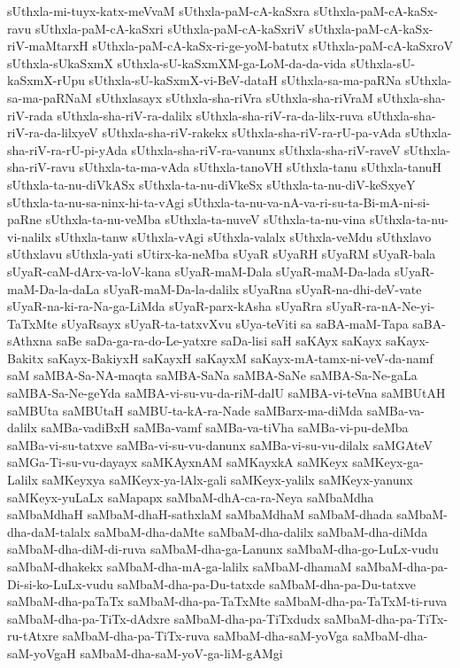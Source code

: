 {sUthxla-mi-tuyx-katx-meVvaM
sUthxla-paM-cA-kaSxra
sUthxla-paM-cA-kaSx-ravu
sUthxla-paM-cA-kaSxri
sUthxla-paM-cA-kaSxriV
sUthxla-paM-cA-kaSx-riV-maMtarxH
sUthxla-paM-cA-kaSx-ri-ge-yoM-batutx
sUthxla-paM-cA-kaSxroV
sUthxla-sUkaSxmX
sUthxla-sU-kaSxmXM-ga-LoM-da-da-vida
sUthxla-sU-kaSxmX-rUpu
sUthxla-sU-kaSxmX-vi-BeV-dataH
sUthxla-sa-ma-paRNa
sUthxla-sa-ma-paRNaM
sUthxlasayx
sUthxla-sha-riVra
sUthxla-sha-riVraM
sUthxla-sha-riV-rada
sUthxla-sha-riV-ra-dalilx
sUthxla-sha-riV-ra-da-lilx-ruva
sUthxla-sha-riV-ra-da-lilxyeV
sUthxla-sha-riV-rakekx
sUthxla-sha-riV-ra-rU-pa-vAda
sUthxla-sha-riV-ra-rU-pi-yAda
sUthxla-sha-riV-ra-vanunx
sUthxla-sha-riV-raveV
sUthxla-sha-riV-ravu
sUthxla-ta-ma-vAda
sUthxla-tanoVH
sUthxla-tanu
sUthxla-tanuH
sUthxla-ta-nu-diVkASx
sUthxla-ta-nu-diVkeSx
sUthxla-ta-nu-diV-keSxyeY
sUthxla-ta-nu-sa-ninx-hi-ta-vAgi
sUthxla-ta-nu-va-nA-va-ri-su-ta-Bi-mA-ni-si-paRne
sUthxla-ta-nu-veMba
sUthxla-ta-nuveV
sUthxla-ta-nu-vina
sUthxla-ta-nu-vi-nalilx
sUthxla-tanw
sUthxla-vAgi
sUthxla-valalx
sUthxla-veMdu
sUthxlavo
sUthxlavu
sUthxla-yati
sUtirx-ka-neMba
sUyaR
sUyaRH
sUyaRM
sUyaR-bala
sUyaR-caM-dArx-va-loV-kana
sUyaR-maM-Dala
sUyaR-maM-Da-lada
sUyaR-maM-Da-la-daLa
sUyaR-maM-Da-la-dalilx
sUyaRna
sUyaR-na-dhi-deV-vate
sUyaR-na-ki-ra-Na-ga-LiMda
sUyaR-parx-kAsha
sUyaRra
sUyaR-ra-nA-Ne-yi-TaTxMte
sUyaRsayx
sUyaR-ta-tatxvXvu
sUya-teViti
sa
saBA-maM-Tapa
saBA-sAthxna
saBe
saDa-ga-ra-do-Le-yatxre
saDa-lisi
saH
saKAyx
saKayx
saKayx-Bakitx
saKayx-BakiyxH
saKayxH
saKayxM
saKayx-mA-tamx-ni-veV-da-namf
saM
saMBA-Sa-NA-maqta
saMBA-SaNa
saMBA-SaNe
saMBA-Sa-Ne-gaLa
saMBA-Sa-Ne-geYda
saMBA-vi-su-vu-da-riM-dalU
saMBA-vi-teVna
saMBUtAH
saMBUta
saMBUtaH
saMBU-ta-kA-ra-Nade
saMBarx-ma-diMda
saMBa-va-dalilx
saMBa-vadiBxH
saMBa-vamf
saMBa-va-tiVha
saMBa-vi-pu-deMba
saMBa-vi-su-tatxve
saMBa-vi-su-vu-danunx
saMBa-vi-su-vu-dilalx
saMGAteV
saMGa-Ti-su-vu-dayayx
saMKAyxnAM
saMKayxkA
saMKeyx
saMKeyx-ga-Lalilx
saMKeyxya
saMKeyx-ya-lAlx-gali
saMKeyx-yalilx
saMKeyx-yanunx
saMKeyx-yuLaLx
saMapapx
saMbaM-dhA-ca-ra-Neya
saMbaMdha
saMbaMdhaH
saMbaM-dhaH-sathxlaM
saMbaMdhaM
saMbaM-dhada
saMbaM-dha-daM-talalx
saMbaM-dha-daMte
saMbaM-dha-dalilx
saMbaM-dha-diMda
saMbaM-dha-diM-di-ruva
saMbaM-dha-ga-Lanunx
saMbaM-dha-go-LuLx-vudu
saMbaM-dhakekx
saMbaM-dha-mA-ga-lalilx
saMbaM-dhamaM
saMbaM-dha-pa-Di-si-ko-LuLx-vudu
saMbaM-dha-pa-Du-tatxde
saMbaM-dha-pa-Du-tatxve
saMbaM-dha-paTaTx
saMbaM-dha-pa-TaTxMte
saMbaM-dha-pa-TaTxM-ti-ruva
saMbaM-dha-pa-TiTx-dAdxre
saMbaM-dha-pa-TiTxdudx
saMbaM-dha-pa-TiTx-ru-tAtxre
saMbaM-dha-pa-TiTx-ruva
saMbaM-dha-saM-yoVga
saMbaM-dha-saM-yoVgaH
saMbaM-dha-saM-yoV-ga-liM-gAMgi
}
